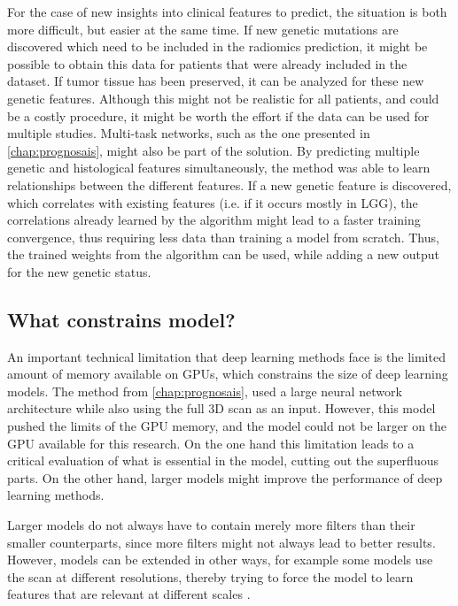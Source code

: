 For the case of new insights into clinical features to predict, the situation is both more difficult, but easier at the same time.
If new genetic mutations are discovered which need to be included in the radiomics prediction, it might be possible to obtain this data for patients that were already included in the dataset.
If tumor tissue has been preserved, it can be analyzed for these new genetic features.
Although this might not be realistic for all patients, and could be a costly procedure, it might be worth the effort if the data can be used for multiple studies.
Multi-task networks, such as the one presented in \cref{chap:prognosais}, might also be part of the solution.
By predicting multiple genetic and histological features simultaneously, the method was able to learn relationships between the different features.
If a new genetic feature is discovered, which correlates with existing features (i.e. if it occurs mostly in \gls{LGG}), the correlations already learned by the algorithm might lead to a faster training convergence, thus requiring less data than training a model from scratch.
Thus, the trained weights from the algorithm can be used, while adding a new output for the new genetic status.


\subsection{What constrains model?}

An important technical limitation that deep learning methods face is the limited amount of memory available on GPUs, which constrains the size of deep learning models.
The method from \cref{chap:prognosais}, used a large neural network architecture while also using the full 3D scan as an input.
However, this model pushed the limits of the GPU memory, and the model could not be larger on the GPU available for this research.
On the one hand this limitation leads to a critical evaluation of what is essential in the model, cutting out the superfluous parts.
On the other hand, larger models might improve the performance of deep learning methods.

Larger models do not always have to contain merely more filters than their smaller counterparts, since more filters might not always lead to better results.
However, models can be extended in other ways, for example some models use the scan at different resolutions, thereby trying to force the model to learn features that are relevant at different scales \autocite{akkus20171p19q}.

